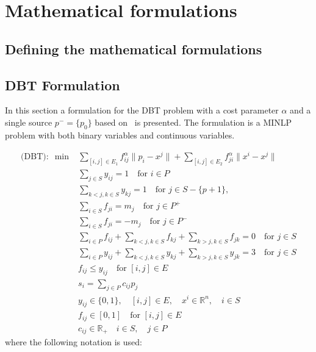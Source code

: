 \documentclass[12pt,a4paper]{article}
\numberwithin{equation}{section}
\theoremstyle{mytheorem}
\theoremstyle{myremark}
\theoremstyle{myparagraph}
\newcommand{\R}{\mathbb{R}}
\begin{document}
    \section{Mathematical formulations}

    \subsection{Defining the mathematical formulations}

    \subsection{DBT Formulation}

    In this section a formulation for the DBT problem with a cost parameter $\alpha$ and a
    single source $p^-=\{p_0\}$ based on~\cite[MMX]{mmx} is presented.
    The formulation is a MINLP problem with both binary variables and continuous variables.

    \begin{align}
        \text{(DBT)}: \; \min &\sum_{[i,j] \in E_1} f_{ij}^{\alpha}\|p_i - x^j\| + \sum_{[i,j] \in E_2} f_{ji}^{\alpha}\|x^i - x^j\| \\
        & \sum_{j \in S} y_{ij} = 1 \quad \text{for } i \in P \\
        & \sum_{k < j, k \in S} y_{kj} = 1 \quad \text{for } j \in S - \{p+1\}, \label{dbt_form:connectedness} \\
        & \sum_{i \in S} f_{ji} = m_j \quad \text{for } j \in P^+ \label{dbt_form:sum_sinks} \\
        & \sum_{i \in S} f_{ji} = -m_j \quad \text{for } j \in P^- \label{dbt_form:sum_sources} \\
        & \sum_{i \in P} f_{ij} + \sum_{k < j, k \in S} f_{kj} + \sum_{k > j, k \in S} f_{jk} = 0 \quad \text{for } j \in S \label{dbt_form:sum_steiner_0}  \\
        & \sum_{i \in P} y_{ij} + \sum_{k < j, k \in S} y_{kj} + \sum_{k > j, k \in S} y_{jk} = 3 \quad \text{for } j \in S \label{dbt_form:degree_bound} \\
        & f_{ij} \le y_{ij} \quad \text{for } [i,j] \in E \\
        & s_i = \sum_{j \in P} c_{ij} p_j \\
        & y_{ij} \in \{0, 1\}, \quad [i, j] \in E, \quad x^i \in \mathbb{R}^n, \quad i \in S \\
        & f_{ij} \in [0,1] \quad \text{for } [i,j] \in E\\
        & c_{ij} \in \R_+ \quad i \in S, \quad j \in P
    \end{align}
    where the following notation is used:
\end{document}
